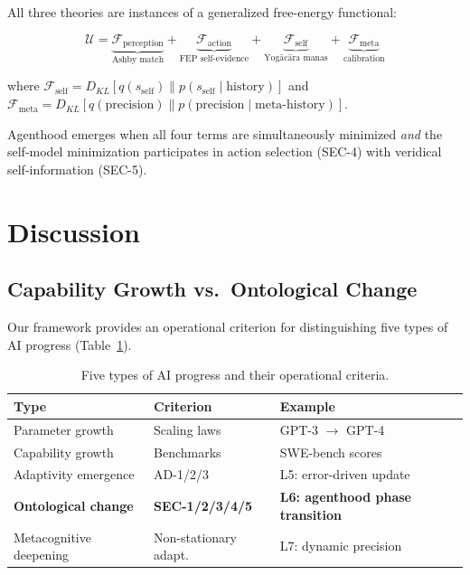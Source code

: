 \documentclass[11pt,a4paper]{article}
\begin{document}
All three theories are instances of a generalized free-energy functional:

$$\mathcal{U} = \underbrace{\mathcal{F}_{\text{perception}}}_{\text{Ashby match}} + \underbrace{\mathcal{F}_{\text{action}}}_{\text{FEP self-evidence}} + \underbrace{\mathcal{F}_{\text{self}}}_{\text{Yog\={a}c\={a}ra manas}} + \underbrace{\mathcal{F}_{\text{meta}}}_{\text{calibration}}$$

where $\mathcal{F}_{\text{self}} = D_{KL}[q(s_{\text{self}}) \| p(s_{\text{self}} \mid \text{history})]$ and $\mathcal{F}_{\text{meta}} = D_{KL}[q(\text{precision}) \| p(\text{precision} \mid \text{meta-history})]$.

Agenthood emerges when all four terms are simultaneously minimized \emph{and} the self-model minimization participates in action selection (SEC-4) with veridical self-information (SEC-5).

\section{Discussion}

\subsection{Capability Growth vs.~Ontological Change}

Our framework provides an operational criterion for distinguishing five types of AI progress (Table~\ref{tab:progress-types}).

\begin{table}[h]
\centering
\begin{tabular}{lll}
\toprule
Type & Criterion & Example \\
\midrule
Parameter growth & Scaling laws & GPT-3 $\to$ GPT-4 \\
Capability growth & Benchmarks & SWE-bench scores \\
Adaptivity emergence & AD-1/2/3 & L5: error-driven update \\
\textbf{Ontological change} & \textbf{SEC-1/2/3/4/5} & \textbf{L6: agenthood phase transition} \\
Metacognitive deepening & Non-stationary adapt. & L7: dynamic precision \\
\bottomrule
\end{tabular}
\caption{Five types of AI progress and their operational criteria.}
\label{tab:progress-types}
\end{table}
\end{document}
